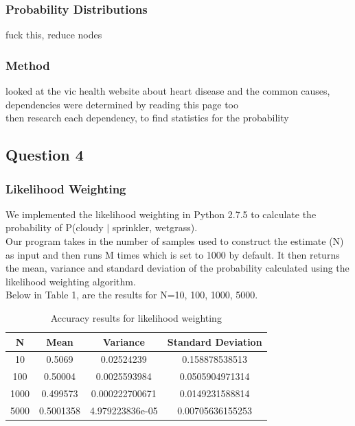 \documentclass{article}
\begin{document}
\subsubsection{Probability Distributions}

fuck this, reduce nodes

\subsubsection{Method}
looked at the vic health website about heart disease and the common causes, dependencies were determined by reading this page too \\

then research each dependency, to find statistics for the probability

\subsection{Question 4}
\subsubsection{Likelihood Weighting}

We implemented the likelihood weighting in Python 2.7.5 to calculate the probability of P(cloudy $|$ sprinkler, wetgrass). \\

Our program takes in the number of samples used to construct the estimate (N) as input and then runs M times which is set to 1000 by default. It then returns the mean, variance and standard deviation of the probability calculated using the likelihood weighting algorithm.\\

Below in Table 1, are the results for N=10, 100, 1000, 5000.

\begin{table}[h]
\centering
\begin{tabular}{|c|c|c|c|}
\hline
N    & Mean      & Variance        & Standard Deviation \\ \hline
10   & 0.5069    & 0.02524239      & 0.158878538513     \\ \hline
100  & 0.50004   & 0.0025593984    & 0.0505904971314    \\ \hline
1000 & 0.499573  & 0.000222700671  & 0.0149231588814    \\ \hline
5000 & 0.5001358 & 4.979223836e-05 & 0.00705636155253   \\ \hline
\end{tabular}
\caption {Accuracy results for likelihood weighting}
\end{table}
\end{document}
